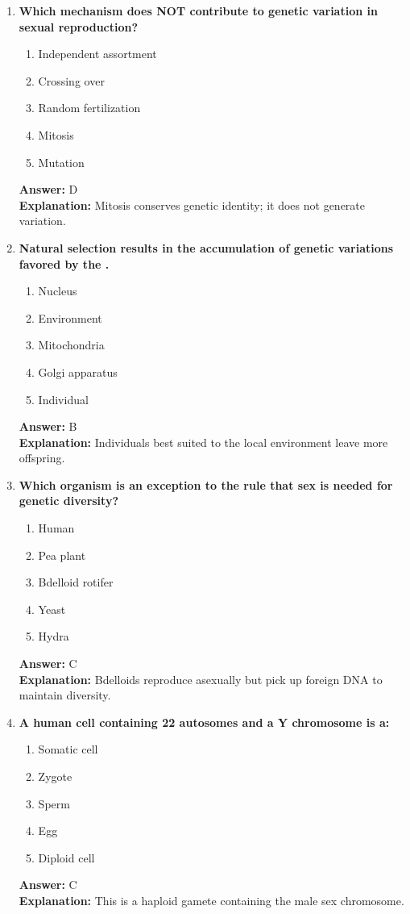 \documentclass[11pt, a4paper]{article}
\begin{document}
\begin{enumerate}[leftmargin=*, label=\arabic*.]
\item \textbf{Which mechanism does NOT contribute to genetic variation in sexual reproduction?}
\begin{enumerate}[label=\Alph*.]
\item Independent assortment
\item Crossing over
\item Random fertilization
\item Mitosis
\item Mutation
\end{enumerate}
\textbf{Answer:} D \\
\textbf{Explanation:} Mitosis conserves genetic identity; it does not generate variation.

\item \textbf{Natural selection results in the accumulation of genetic variations favored by the \underline{\hspace{1cm}}.}
\begin{enumerate}[label=\Alph*.]
\item Nucleus
\item Environment
\item Mitochondria
\item Golgi apparatus
\item Individual
\end{enumerate}
\textbf{Answer:} B \\
\textbf{Explanation:} Individuals best suited to the local environment leave more offspring.

\item \textbf{Which organism is an exception to the rule that sex is needed for genetic diversity?}
\begin{enumerate}[label=\Alph*.]
\item Human
\item Pea plant
\item Bdelloid rotifer
\item Yeast
\item Hydra
\end{enumerate}
\textbf{Answer:} C \\
\textbf{Explanation:} Bdelloids reproduce asexually but pick up foreign DNA to maintain diversity.

\item \textbf{A human cell containing 22 autosomes and a Y chromosome is a:}
\begin{enumerate}[label=\Alph*.]
\item Somatic cell
\item Zygote
\item Sperm
\item Egg
\item Diploid cell
\end{enumerate}
\textbf{Answer:} C \\
\textbf{Explanation:} This is a haploid gamete containing the male sex chromosome.


\end{enumerate}
\end{document}
